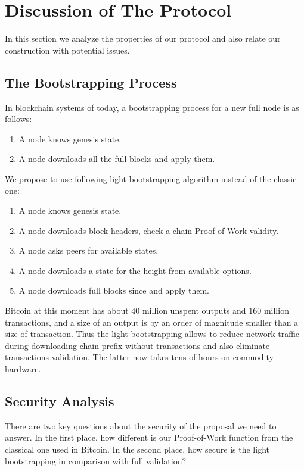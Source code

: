 \documentclass[conference,compsoc]{IEEEtran}
\begin{document}
\section{Discussion of The Protocol}
\label{discussion}

In this section we analyze the properties of our protocol and also relate our construction with potential issues.

\subsection{The Bootstrapping Process}

In blockchain systems of today, a bootstrapping process for a new full node is as follows:

\begin{enumerate}
\item A node knows genesis state.
\item A node downloads all the full blocks and apply them. 
\end{enumerate}


We propose to use following light bootstrapping algorithm instead of the classic one:

\begin{enumerate}
\item A node knows genesis state.
\item A node downloads block headers, check a chain Proof-of-Work validity. 
\item A node asks peers for available states. 
\item A node downloads a state  for the height  from available options.
\item A node downloads full blocks since  and apply them. 
\end{enumerate}

Bitcoin at this moment has about 40 million unspent outputs and 160 million transactions, and a size of an output is by an order of magnitude smaller than a size of transaction. Thus the light bootstrapping allows to reduce network traffic during downloading chain prefix without transactions and also eliminate transactions validation. The latter now takes tens of hours on commodity hardware. 


\subsection{Security Analysis}
\label{protocol_props}

There are two key questions about the security of the proposal we need to answer. In the first place, how different is our Proof-of-Work function from the classical one used in Bitcoin. In the second place, how secure is the light bootstrapping in comparison with full validation? 
\end{document}
